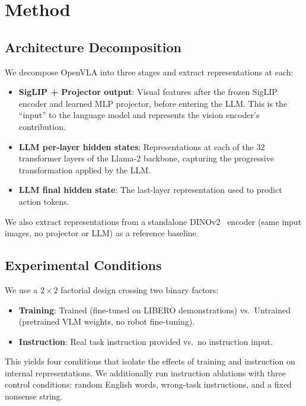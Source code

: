 \documentclass[letterpaper]{article}
\begin{document}
\section{Method}
\label{sec:method}

\subsection{Architecture Decomposition}

We decompose OpenVLA into three stages and extract representations at each:
\begin{itemize}
    \item \textbf{SigLIP + Projector output}: Visual features after the frozen SigLIP encoder and learned MLP projector, before entering the LLM. This is the ``input'' to the language model and represents the vision encoder's contribution.
    \item \textbf{LLM per-layer hidden states}: Representations at each of the 32 transformer layers of the Llama-2 backbone, capturing the progressive transformation applied by the LLM.
    \item \textbf{LLM final hidden state}: The last-layer representation used to predict action tokens.
\end{itemize}
We also extract representations from a standalone DINOv2~\citep{oquab2023dinov2} encoder (same input images, no projector or LLM) as a reference baseline.

\subsection{Experimental Conditions}

We use a $2 \times 2$ factorial design crossing two binary factors:
\begin{itemize}
    \item \textbf{Training}: Trained (fine-tuned on LIBERO demonstrations) vs.\ Untrained (pretrained VLM weights, no robot fine-tuning).
    \item \textbf{Instruction}: Real task instruction provided vs.\ no instruction input.
\end{itemize}
This yields four conditions that isolate the effects of training and instruction on internal representations.
We additionally run instruction ablations with three control conditions: random English words, wrong-task instructions, and a fixed nonsense string.
\end{document}
